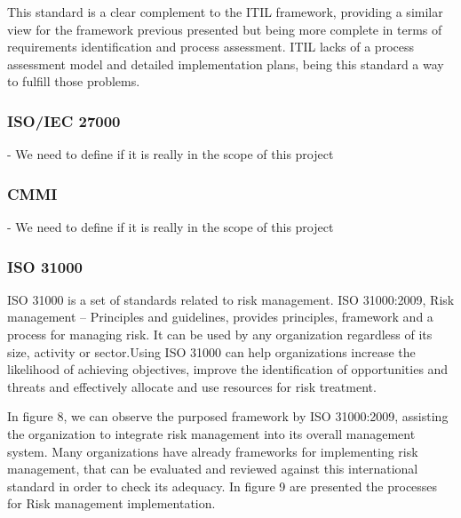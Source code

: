 \begin{itemize}
  This standard is a clear complement to the ITIL framework, providing a similar view for the framework previous presented but being more complete in terms of requirements identification and process assessment. ITIL lacks of a process assessment model and detailed implementation plans, being this standard a way to fulfill those problems.\par
  
\end{itemize}

\subsubsection{ISO/IEC 27000} - We need to define if it is really in the scope of this project

\subsubsection{CMMI} - We need to define if it is really in the scope of this project

\subsubsection{ISO 31000}

ISO 31000 is a set of standards related to risk management. ISO 31000:2009, Risk management – Principles and guidelines, provides principles, framework and a process for managing risk. It can be used by any organization regardless of its size, activity or sector.Using ISO 31000 can help organizations increase the likelihood of achieving objectives, improve the identification of opportunities and threats and effectively allocate and use resources for risk treatment.\par
In figure 8, we can observe the purposed framework by ISO 31000:2009, assisting the organization to integrate risk management into its overall management system. Many organizations have already frameworks for implementing risk management, that can be evaluated and reviewed against this international standard in order to check its adequacy. In figure 9 are presented the processes for Risk management implementation.\par

